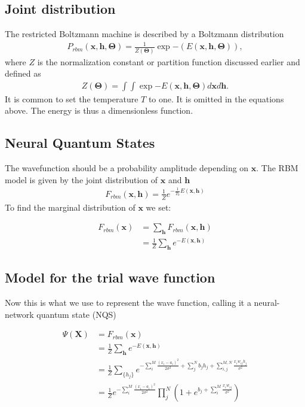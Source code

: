 \documentclass[%
oneside,                 %
final,                   %
10pt]{article}
\begin{document}
\subsection{Joint distribution}

The restricted Boltzmann machine is described by a Boltzmann distribution
\begin{align*}
	P_{rbm}(\bm{x},\bm{h},\bm{\Theta}) = \frac{1}{Z(\bm{\Theta})} \exp{-(E(\bm{x},\bm{h},\bm{\Theta}))},
\end{align*}
where $Z$ is the normalization constant or partition function discussed earlier and defined as 
\begin{align*}
	Z(\bm{\Theta}) = \int \int \exp{-E(\bm{x},\bm{h},\bm{\Theta})} d\bm{x} d\bm{h}.
\end{align*}
It is common to set  the temperature $T$ to one. It is omitted in the equations above. The energy is thus a dimensionless function.


\subsection{Neural Quantum States}

The wavefunction should be a probability amplitude depending on $\bm{x}$. The RBM model is given by the joint distribution of $\bm{x}$ and $\bm{h}$
\begin{align*}
	F_{rbm}(\bm{x},\mathbf{h}) = \frac{1}{Z} e^{-\frac{1}{T_0}E(\bm{x},\mathbf{h})}
\end{align*}
To find the marginal distribution of $\bm{x}$ we set:

\begin{align*}
	F_{rbm}(\mathbf{x}) &= \sum_\mathbf{h} F_{rbm}(\mathbf{x}, \mathbf{h}) \\
				&= \frac{1}{Z}\sum_\mathbf{h} e^{-E(\mathbf{x}, \mathbf{h})}
\end{align*}

\subsection{Model for the trial wave function}
Now this is what we use to represent the wave function, calling it a neural-network quantum state (NQS)

\begin{align*}
	\Psi (\mathbf{X}) &= F_{rbm}(\mathbf{x}) \\
	&= \frac{1}{Z}\sum_{\bm{h}} e^{-E(\mathbf{x}, \mathbf{h})} \\
	&= \frac{1}{Z} \sum_{\{h_j\}} e^{-\sum_i^M \frac{(x_i - a_i)^2}{2\sigma^2} + \sum_j^N b_j h_j + \sum_{i,j}^{M,N} \frac{x_i w_{ij} h_j}{\sigma^2}} \\
	&= \frac{1}{Z} e^{-\sum_i^M \frac{(x_i - a_i)^2}{2\sigma^2}} \prod_j^N (1 + e^{b_j + \sum_i^M \frac{x_i w_{ij}}{\sigma^2}}) \\
\end{align*}
\end{document}
